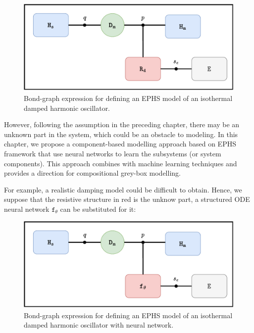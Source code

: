\documentclass[
	parskip, 			   %
	twoside, 			   %
	DIV=14, 			   %
	BCOR=15.0mm, 		   %
	headsepline, 		   %
	open=right, 		   %
	captions=tableheading, %
	bibliography=totoc,    %
	numbers=noenddot       %
]{scrreprt}
\begin{document}
\begin{figure}[h!]
    \centering
    \includegraphics[scale=0.6]{figures/bondgraph_idho_exergetic.pdf}
    \caption{Bond-graph expression for defining an EPHS model of an isothermal damped harmonic oscillator.}
    \label{fig:bondgraph_idho_exergetic}
\end{figure}

However, following the assumption in the preceding chapter, there may be an unknown part in the system, which could be an obstacle to modeling. In this chapter, we propose a component-based modelling approach based on EPHS framework that use neural networks to learn the subsystems (or system components). This approach combines with machine learning techniques and provides a direction for compositional grey-box modelling.

For example, a realistic damping model could be difficult to obtain. Hence, we suppose that the resistive structure in red is the unknow part, a structured ODE neural network $\mathtt{f_{\theta}}$ can be substituted for it:

\clearpage
\begin{figure}[h!]
    \centering
    \includegraphics[scale=0.6]{figures/bondgraph_idho_exergetic_NN.pdf}
    \caption{Bond-graph expression for defining an EPHS model of an isothermal damped harmonic oscillator with neural network.}
    \label{fig:bondgraph_idho_exergetic_NN}
\end{figure}
\end{document}
